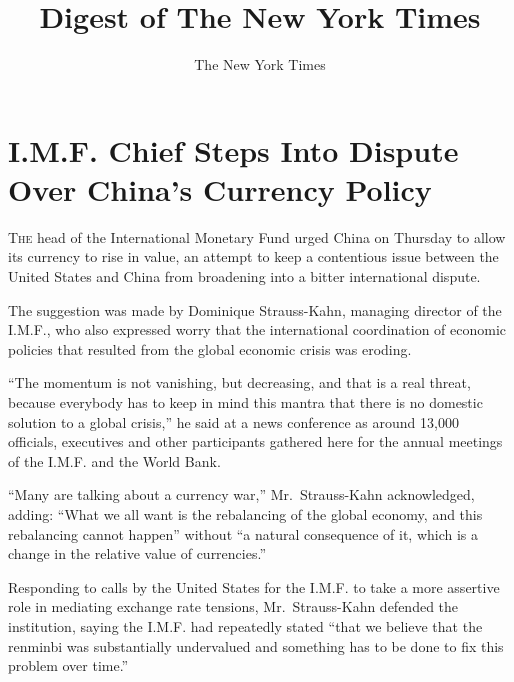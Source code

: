 ﻿\documentclass[12pt]{article}
\title{Digest of The New York Times}
\author{The New York Times}
\begin{document}
\date{}

\cfoot{\textsf{\thepage}}

\tableofcontents

\clearpage
\setcounter{page}{1}

\section{I.M.F. Chief Steps Into Dispute Over China's Currency Policy}

\lettrine{T}{he} head of the International Monetary Fund urged China on
Thursday to allow its currency to rise in value, an attempt to keep a contentious issue between the
United States and China from broadening into a bitter international dispute.

The suggestion was made by Dominique Strauss-Kahn, managing director of the I.M.F., who also
expressed worry that the international coordination of economic policies that resulted from the
global economic crisis was eroding.

``The momentum is not vanishing, but decreasing, and that is a real threat, because everybody has to
keep in mind this mantra that there is no domestic solution to a global crisis,'' he said at a news
conference as around 13,000 officials, executives and other participants gathered here for the
annual meetings of the I.M.F. and the World Bank.

``Many are talking about a currency war,'' Mr.~Strauss-Kahn acknowledged, adding: ``What we all want
is the rebalancing of the global economy, and this rebalancing cannot happen'' without ``a natural
consequence of it, which is a change in the relative value of currencies.''

Responding to calls by the United States for the I.M.F. to take a more assertive role in mediating
exchange rate tensions, Mr.~Strauss-Kahn defended the institution, saying the I.M.F. had repeatedly
stated ``that we believe that the renminbi was substantially undervalued and something has to be
done to fix this problem over time.''
\end{document}
